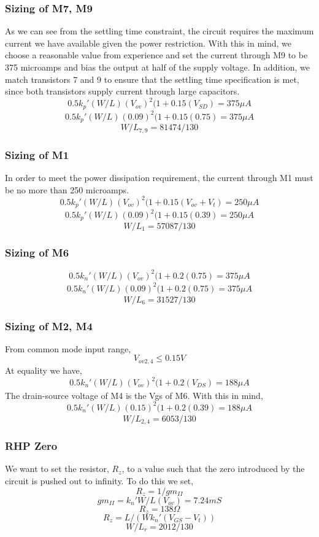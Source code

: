 \documentclass[]{article}
\begin{document}
			\subsubsection{Sizing of M7, M9}
				$$$$
				As we can see from the settling time constraint, the circuit requires the maximum current we have available given the power restriction. With this in mind, we choose a reasonable value from experience and set the current through M9 to be 375 microamps and bias the output at half of the supply voltage. In addition, we match transistors 7 and 9 to ensure that the settling time specification is met, since both transistors supply current through large capacitors.
				$$0.5k_{p}'(W/L)_{}(V_{ov})^2(1+0.15(V_{SD}) = 375 \mu A $$
				$$0.5k_{p}'(W/L)_{}(0.09)^2(1+0.15(0.75) = 375 \mu A $$
				$$W/L_{7,9} = 81474/130$$
			
			\subsubsection{Sizing of M1}
				$$$$
				In order to meet the power dissipation requirement, the current through M1 must be no more than 250 microamps.
				$$0.5k_{p}'(W/L)_{}(V_{ov})^2(1+0.15(V_{ov}+V_{t}) = 250 \mu A $$
				$$0.5k_{p}'(W/L)_{}(0.09)^2(1+0.15(0.39) = 250 \mu A $$
				$$W/L_{1} = 57087/130$$
			
			\subsubsection{Sizing of M6}
				$$0.5k_{n}'(W/L)_{}(V_{ov})^2(1+0.2(0.75) = 375 \mu A $$
				$$0.5k_{n}'(W/L)_{}(0.09)^2(1+0.2(0.75) = 375 \mu A $$
				$$ W/L_{6} = 31527/130 $$
			
			\subsubsection{Sizing of M2, M4}
				$$$$
				From common mode input range,
				$$V_{ov2,4} \le 0.15V $$
				At equality we have,
				$$0.5k_{n}'(W/L)_{}(V_{ov})^2(1+0.2(V_{DS}) = 188 \mu A $$
				The drain-source voltage of M4 is the Vgs of M6. With this in mind,
				$$0.5k_{n}'(W/L)_{}(0.15)^2(1+0.2(0.39) = 188 \mu A $$
				$$W/L_{2,4} = 6053/130 $$
			
			\subsubsection{RHP Zero}
				$$$$
				We want to set the resistor, $R_{z}$, to a value such that the zero introduced by the circuit is pushed out to infinity. To do this we set,
				$$ R_{z} = 1/gm_{II} $$
				$$ gm_{II} = k_{n}'W/L(V_{ov}) = 7.24 mS $$
				$$R_{z} = 138 \Omega$$
				$$R_{z} = L/(Wk_{n}'(V_{GS}-V_{t})) $$
				$$ W/L_{r} = 2012/130 $$
			
\end{document}
